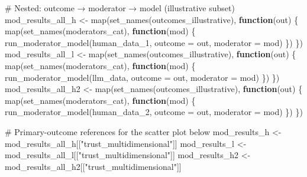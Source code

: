 \documentclass[
  letterpaper,
  DIV=11,
  numbers=noendperiod]{scrartcl}
\newenvironment{Shaded}{\begin{snugshade}}{\end{snugshade}}
\newcommand{\AttributeTok}[1]{\textcolor[rgb]{0.40,0.45,0.13}{#1}}
\newcommand{\CommentTok}[1]{\textcolor[rgb]{0.37,0.37,0.37}{#1}}
\newcommand{\ControlFlowTok}[1]{\textcolor[rgb]{0.00,0.23,0.31}{\textbf{#1}}}
\newcommand{\FunctionTok}[1]{\textcolor[rgb]{0.28,0.35,0.67}{#1}}
\newcommand{\NormalTok}[1]{\textcolor[rgb]{0.00,0.23,0.31}{#1}}
\newcommand{\OtherTok}[1]{\textcolor[rgb]{0.00,0.23,0.31}{#1}}
\newcommand{\StringTok}[1]{\textcolor[rgb]{0.13,0.47,0.30}{#1}}
\begin{document}
\begin{Shaded}
\begin{Highlighting}[]
\CommentTok{\# Nested: outcome → moderator → model (illustrative subset)}
\NormalTok{mod\_results\_all\_h }\OtherTok{\textless{}{-}} \FunctionTok{map}\NormalTok{(}\FunctionTok{set\_names}\NormalTok{(outcomes\_illustrative), }\ControlFlowTok{function}\NormalTok{(out) \{}
  \FunctionTok{map}\NormalTok{(}\FunctionTok{set\_names}\NormalTok{(moderators\_cat), }\ControlFlowTok{function}\NormalTok{(mod) \{}
    \FunctionTok{run\_moderator\_model}\NormalTok{(human\_data\_1, }\AttributeTok{outcome =}\NormalTok{ out, }\AttributeTok{moderator =}\NormalTok{ mod)}
\NormalTok{  \})}
\NormalTok{\})}
\NormalTok{mod\_results\_all\_l }\OtherTok{\textless{}{-}} \FunctionTok{map}\NormalTok{(}\FunctionTok{set\_names}\NormalTok{(outcomes\_illustrative), }\ControlFlowTok{function}\NormalTok{(out) \{}
  \FunctionTok{map}\NormalTok{(}\FunctionTok{set\_names}\NormalTok{(moderators\_cat), }\ControlFlowTok{function}\NormalTok{(mod) \{}
    \FunctionTok{run\_moderator\_model}\NormalTok{(llm\_data, }\AttributeTok{outcome =}\NormalTok{ out, }\AttributeTok{moderator =}\NormalTok{ mod)}
\NormalTok{  \})}
\NormalTok{\})}
\NormalTok{mod\_results\_all\_h2 }\OtherTok{\textless{}{-}} \FunctionTok{map}\NormalTok{(}\FunctionTok{set\_names}\NormalTok{(outcomes\_illustrative), }\ControlFlowTok{function}\NormalTok{(out) \{}
  \FunctionTok{map}\NormalTok{(}\FunctionTok{set\_names}\NormalTok{(moderators\_cat), }\ControlFlowTok{function}\NormalTok{(mod) \{}
    \FunctionTok{run\_moderator\_model}\NormalTok{(human\_data\_2, }\AttributeTok{outcome =}\NormalTok{ out, }\AttributeTok{moderator =}\NormalTok{ mod)}
\NormalTok{  \})}
\NormalTok{\})}

\CommentTok{\# Primary{-}outcome references for the scatter plot below}
\NormalTok{mod\_results\_h  }\OtherTok{\textless{}{-}}\NormalTok{ mod\_results\_all\_h[[}\StringTok{"trust\_multidimensional"}\NormalTok{]]}
\NormalTok{mod\_results\_l  }\OtherTok{\textless{}{-}}\NormalTok{ mod\_results\_all\_l[[}\StringTok{"trust\_multidimensional"}\NormalTok{]]}
\NormalTok{mod\_results\_h2 }\OtherTok{\textless{}{-}}\NormalTok{ mod\_results\_all\_h2[[}\StringTok{"trust\_multidimensional"}\NormalTok{]]}
\end{Highlighting}
\end{Shaded}
\end{document}
